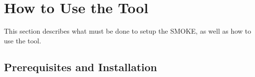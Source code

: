 \documentclass{article}
\makeatletter
\newcommand{\toolname}{SMOKE\@\xspace}
\makeatother
\begin{document}
%
	
\section{How to Use the Tool}
This section describes what must be done to setup the \toolname, as well as how to use the tool.

\subsection{Prerequisites and Installation}
\end{document}
